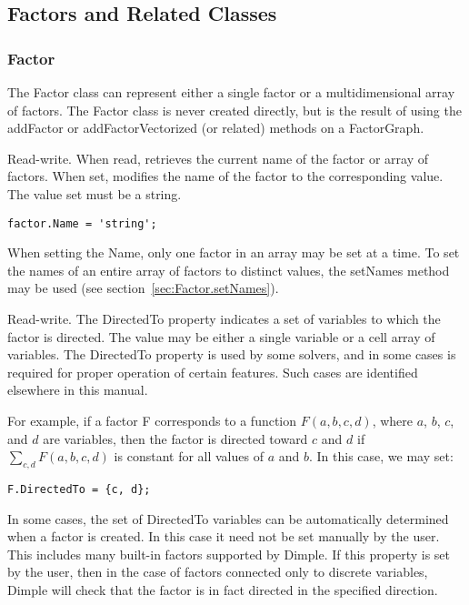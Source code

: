 \subsection{Factors and Related Classes}

\subsubsection{Factor}

The Factor class can represent either a single factor or a multidimensional array of factors.  The Factor class is never created directly, but is the result of using the addFactor or addFactorVectorized (or related) methods on a FactorGraph.



Read-write.  When read, retrieves the current name of the factor or array of factors.  When set, modifies the name of the factor to the corresponding value.  The value set must be a string.

\begin{lstlisting}
factor.Name = 'string';
\end{lstlisting}

When setting the Name, only one factor in an array may be set at a time.  To set the names of an entire array of factors to distinct values, the setNames method may be used (see section~\ref{sec:Factor.setNames}).


\label{sec:Factor.DirectedTo}

Read-write.  The DirectedTo property indicates a set of variables to which the factor is directed.  The value may be either a single variable or a cell array of variables.  The DirectedTo property is used by some solvers, and in some cases is required for proper operation of certain features.  Such cases are identified elsewhere in this manual.

For example, if a factor F corresponds to a function $F(a, b, c, d)$, where $a$, $b$, $c$, and $d$ are variables, then the factor is directed toward $c$ and $d$ if $\sum_{c, d} F(a, b, c, d)$ is constant for all values of $a$ and $b$.  In this case, we may set:

\begin{lstlisting}
F.DirectedTo = {c, d};
\end{lstlisting}

In some cases, the set of DirectedTo variables can be automatically determined when a factor is created.  In this case it need not be set manually by the user.  This includes many built-in factors supported by Dimple.  If this property is set by the user, then in the case of factors connected only to discrete variables, Dimple will check that the factor is in fact directed in the specified direction.

